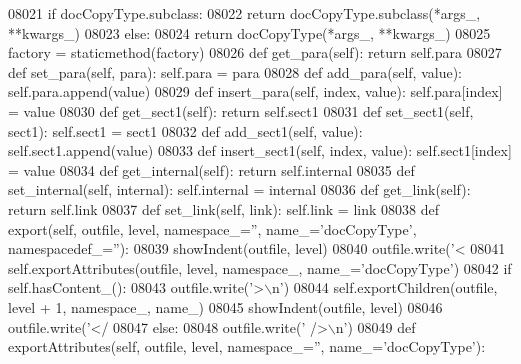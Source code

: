 \begin{DoxyCode}
{{{{{{{{{{{{{{{{{{{{{{{{{{{{{{{{{{{{{{{{{{{{{{{{{{{{{{{{{{{{{{{{{{{{{{{{{{{{{{{{{{{{{{{{{{{{{{{{{{{{{{{{{{{{{{{{{{{{{{{{{{{{{{{{{{{{{{{{{{{{{{{{{{{{{{{{{{{{{{{{{{{{{{{{{{{{{{{{{{{{{{{{{{{{{{{{{{{{{{{{{{{{{{{{{{{{{{{{{{{{{{{{{{{{{{{{{{{{{{{{{{{{{{{{{{{{{{{{{{{{{{{{{{{{{{{{{{{{{{{{{{{{{{{{{{{{{{{{{{{{{{{{{{{{{{{{{{{{{{{{{{{{{{{{{{{{{{{{{{{{{{{{{{{{{{{{{{{{{{{{{{{{{{{{{{{{{{{{{{{{{{{{{{{{{{{{{{{{{{{{{{{{{{{{{{{{{{{{{{{{{{{{{{{{{{{{{{{{{{{{{{{{{{{{{{{{{{{{{{{{{{{{{{{{{{{{{{{{{{{{{{{{{{{{{{{{08021         \textcolor{keywordflow}{if} docCopyType.subclass:
08022             \textcolor{keywordflow}{return} docCopyType.subclass(*args\_, **kwargs\_)
08023         \textcolor{keywordflow}{else}:
08024             \textcolor{keywordflow}{return} docCopyType(*args\_, **kwargs\_)
08025     factory = staticmethod(factory)
08026     \textcolor{keyword}{def }get_para(self): \textcolor{keywordflow}{return} self.para
08027     \textcolor{keyword}{def }set_para(self, para): self.para = para
08028     \textcolor{keyword}{def }add_para(self, value): self.para.append(value)
08029     \textcolor{keyword}{def }insert_para(self, index, value): self.para[index] = value
08030     \textcolor{keyword}{def }get_sect1(self): \textcolor{keywordflow}{return} self.sect1
08031     \textcolor{keyword}{def }set_sect1(self, sect1): self.sect1 = sect1
08032     \textcolor{keyword}{def }add_sect1(self, value): self.sect1.append(value)
08033     \textcolor{keyword}{def }insert_sect1(self, index, value): self.sect1[index] = value
08034     \textcolor{keyword}{def }get_internal(self): \textcolor{keywordflow}{return} self.internal
08035     \textcolor{keyword}{def }set_internal(self, internal): self.internal = internal
08036     \textcolor{keyword}{def }get_link(self): \textcolor{keywordflow}{return} self.link
08037     \textcolor{keyword}{def }set_link(self, link): self.link = link
08038     \textcolor{keyword}{def }export(self, outfile, level, namespace\_='', name\_='docCopyType', namespacedef\_=''):
08039         showIndent(outfile, level)
08040         outfile.write(\textcolor{stringliteral}{'<%
08041         self.exportAttributes(outfile, level, namespace\_, name\_=\textcolor{stringliteral}{'docCopyType'})
08042         \textcolor{keywordflow}{if} self.hasContent_():
08043             outfile.write(\textcolor{stringliteral}{'>\(\backslash\)n'})
08044             self.exportChildren(outfile, level + 1, namespace\_, name\_)
08045             showIndent(outfile, level)
08046             outfile.write(\textcolor{stringliteral}{'</%
08047         \textcolor{keywordflow}{else}:
08048             outfile.write(\textcolor{stringliteral}{' />\(\backslash\)n'})
08049     \textcolor{keyword}{def }exportAttributes(self, outfile, level, namespace\_='', name\_='docCopyType'):
}}}}}}}}}}}}}}}}}}}}}}}}}}}}}}}}}}}}}}}}}}}}}}}}}}}}}}}}}}}}}}}}}}}}}}}}}}}}}}}}}}}}}}}}}}}}}}}}}}}}}}}}}}}}}}}}}}}}}}}}}}}}}}}}}}}}}}}}}}}}}}}}}}}}}}}}}}}}}}}}}}}}}}}}}}}}}}}}}}}}}}}}}}}}}}}}}}}}}}}}}}}}}}}}}}}}}}}}}}}}}}}}}}}}}}}}}}}}}}}}}}}}}}}}}}}}}}}}}}}}}}}}}}}}}}}}}}}}}}}}}}}}}}}}}}}}}}}}}}}}}}}}}}}}}}}}}}}}}}}}}}}}}}}}}}}}}}}}}}}}}}}}}}}}}}}}}}}}}}}}}}}}}}}}}}}}}}}}}}}}}}}}}}}}}}}}}}}}}}}}}}}}}}}}}}}}}}}}}}}}}}}}}}}}}}}}}}}}}}}}}}}}}}}}}}}}}}}}}}}}}}}}}}}}}}}}}}}}}}}}}}}}}}}}}}}}}}
\end{DoxyCode}
